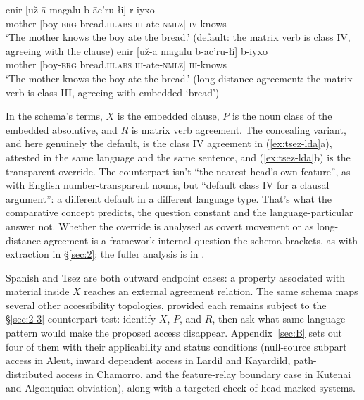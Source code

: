 \ea\label{ex:tsez-lda}
\ea \gll enir [už-ā magalu b-āc'ru-łi] r-iyxo \\
mother [boy-\textsc{erg} bread.\textsc{iii.abs} \textsc{iii}-ate-\textsc{nmlz}] \textsc{iv}-knows \\
\glt `The mother knows the boy ate the bread.' (default: the matrix verb is class IV, agreeing with the clause)
\ex \gll enir [už-ā magalu b-āc'ru-łi] b-iyxo \\
mother [boy-\textsc{erg} bread.\textsc{iii.abs} \textsc{iii}-ate-\textsc{nmlz}] \textsc{iii}-knows \\
\glt `The mother knows the boy ate the bread.' (long-distance agreement: the matrix verb is class III, agreeing with embedded  `bread')
\z
\z

In the schema's terms, $X$ is the embedded clause, $P$ is the noun class of the embedded absolutive, and $R$ is matrix verb agreement. The concealing variant, and here genuinely the default, is the class IV agreement in (\ref{ex:tsez-lda}a), attested in the same language and the same sentence, and (\ref{ex:tsez-lda}b) is the transparent override. The counterpart isn't \enquote{the nearest head's own feature}, as with English number-transparent nouns, but \enquote{default class IV for a clausal argument}: a different default in a different language type. That's what the comparative concept predicts, the question constant and the language-particular answer not. Whether the override is analysed as covert movement or as long-distance agreement is a framework-internal question the schema brackets, as with extraction in §\ref{sec:2}; the fuller analysis is in \textcite{polinsky-potsdam-2001}.

Spanish and Tsez are both outward endpoint cases: a property associated with material inside $X$ reaches an external agreement relation. The same schema maps several other accessibility topologies, provided each remains subject to the §\ref{sec:2-3} counterpart test: identify $X$, $P$, and $R$, then ask what same-language pattern would make the proposed access disappear. Appendix~\ref{sec:B} sets out four of them with their applicability and status conditions (null-source subpart access in Aleut, inward dependent access in Lardil and Kayardild, path-distributed access in Chamorro, and the feature-relay boundary case in Kutenai and Algonquian obviation), along with a targeted check of head-marked systems.

